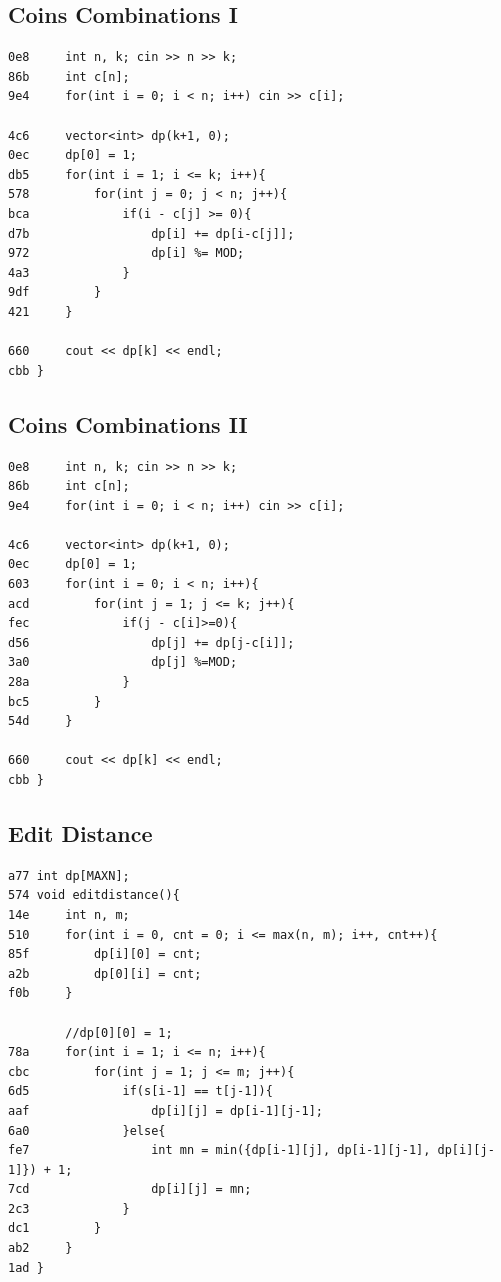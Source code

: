 \documentclass[11pt, a4paper, twoside]{article}
\begin{document}
\subsection{Coins Combinations I}
\begin{lstlisting}
0e8     int n, k; cin >> n >> k;
86b     int c[n];
9e4     for(int i = 0; i < n; i++) cin >> c[i];
 
4c6     vector<int> dp(k+1, 0);
0ec     dp[0] = 1;
db5     for(int i = 1; i <= k; i++){
578         for(int j = 0; j < n; j++){
bca             if(i - c[j] >= 0){
d7b                 dp[i] += dp[i-c[j]];
972                 dp[i] %= MOD;
4a3             }
9df         }
421     }
 
660     cout << dp[k] << endl;
cbb }
\end{lstlisting}

\subsection{Coins Combinations II}
\begin{lstlisting}
0e8     int n, k; cin >> n >> k;
86b     int c[n];
9e4     for(int i = 0; i < n; i++) cin >> c[i];
 
4c6     vector<int> dp(k+1, 0);
0ec     dp[0] = 1;
603     for(int i = 0; i < n; i++){
acd         for(int j = 1; j <= k; j++){
fec             if(j - c[i]>=0){
d56                 dp[j] += dp[j-c[i]];
3a0                 dp[j] %=MOD;
28a             }
bc5         }
54d     }
 
660     cout << dp[k] << endl;
cbb }
\end{lstlisting}

\subsection{Edit Distance}
\begin{lstlisting}
a77 int dp[MAXN];
574 void editdistance(){
14e     int n, m;
510     for(int i = 0, cnt = 0; i <= max(n, m); i++, cnt++){
85f         dp[i][0] = cnt;
a2b         dp[0][i] = cnt;
f0b     }
     
        //dp[0][0] = 1;
78a     for(int i = 1; i <= n; i++){
cbc         for(int j = 1; j <= m; j++){
6d5             if(s[i-1] == t[j-1]){
aaf                 dp[i][j] = dp[i-1][j-1];
6a0             }else{
fe7                 int mn = min({dp[i-1][j], dp[i-1][j-1], dp[i][j-1]}) + 1;
7cd                 dp[i][j] = mn;
2c3             }
dc1         }
ab2     }
1ad }
\end{lstlisting}
\end{document}
